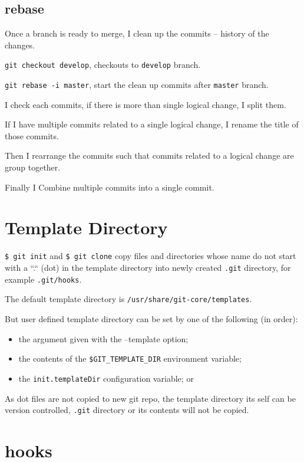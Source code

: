 \subsection{rebase} \label{git_rebase}
Once a branch is ready to merge, I clean up the commits -- history of the changes. 


\texttt{git checkout develop}, checkouts to \texttt{develop} branch.

\texttt{git rebase -i master}, start the clean up commits after \texttt{master} branch.

I check each commits, if there is more than single logical change, I split them.

If I have multiple commits related to a single logical change, I rename the title of those commits.

Then I rearrange the commits such that commits related to a logical change are group together.

Finally I Combine multiple commits into a single commit.


\section{Template Directory}%
\label{sec:template_directory}

\texttt{\$ git init} and \texttt{\$ git clone} copy files and directories whose name do not start with a ``.`` (dot) in the template directory into newly created \texttt{.git} directory, for example \texttt{.git/hooks}.

The default template directory is \texttt{/usr/share/git-core/templates}.

But user defined template directory can be set by one of the following (in order):
\begin{itemize}
  \item the argument given with the --template option;
  \item the contents of the \texttt{\$GIT\_TEMPLATE\_DIR} environment variable;
  \item the \texttt{init.templateDir} configuration variable; or
\end{itemize}


As dot files are not copied to new git repo, the template directory its self can be version controlled, \texttt{.git} directory or its contents will not be copied.


\section{hooks}
